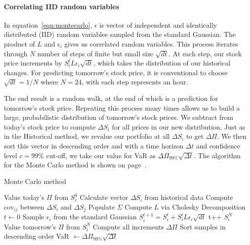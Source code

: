 \documentclass[../Dissertation.tex]{subfiles}
\begin{document}
\paragraph{Correlating IID random variables}
In equation~\ref{eqn:montecarlo}, $\epsilon$ is vector of independent and identically distributed (IID) random variables sampled from the standard Gaussian.	
The product of $L$ and $\epsilon_i$ gives us correlated random variables. 
This process iterates through $N$ number of steps of finite but small size $\sqrt{dt}$.
At each step, our stock price increments by $ S_i ^t L \epsilon_i\sqrt{dt}$, which takes the distribution of our historical changes.
For predicting tomorrow's stock price, it is conventional to choose $\sqrt{dt} = 1/N$ where $N=24$, with each step represents an hour.

The end result is a random walk, at the end of which is a prediction for tomorrow's stock price.
Repeating this process many times allows us to build a large, probabilistic distribution of tomorrow's stock prices.
We subtract from today's stock price to compute $\Delta S_i$ for all prices in our new distribution.
Just as in the Historical method, we revalue our portfolio at all $\Delta S_i$ to get $\Delta\Pi$.
We then sort this vector in descending order and with a time horizon $\Delta t$ and confidence level $c = 99\%$ cut-off, we take our value for VaR as $\Delta\Pi_{99\%}\sqrt{\Delta t}$.
The algorithm for the Monte Carlo method is shown on page~\pageref{alg:montecarlo}.
					\begin{algorithm}
						\caption{Monte Carlo method}
						\begin{algorithmic}[1]
							\label{alg:montecarlo}							
							\State Value today's $\Pi$ from $S_i^0$
							\State Calculate vector $\Delta S_i$ from historical data
							\State Compute $\text{cov}_{ij}$ between $\Delta S_i$ and $\Delta S_j$
							\State Populate $\Sigma$
							\State Compute $L$ via Cholesky Decomposition
							\State $t\gets 0$
								\State Sample $\epsilon_i$ from the standard Gaussian					
								\State $S_i^{t+1} = S_i^t + S_i ^t L \epsilon_i\sqrt{dt}$
								\State t++
							\EndWhile
							\Return $S_i^N$
							\State Value tomorrow's $\Pi$ from $S_i^N$
							\EndFor		
							\State Compute all increments $\Delta\Pi$	
							\State Sort samples in descending order
							\State VaR $\gets \Delta\Pi_{99\%}\sqrt{\Delta t}$				
						\EndProcedure
						\end{algorithmic}
					\end{algorithm}
\end{document}
